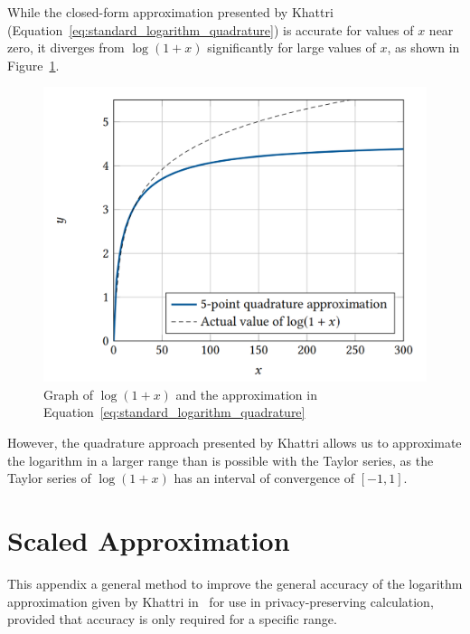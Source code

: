While the closed-form approximation presented by Khattri (Equation~\ref{eq:standard_logarithm_quadrature}) is accurate for values of $x$ near zero, it diverges from $\log{\left(1+x\right)}$ significantly for large values of $x$, as shown in Figure~\ref{fig:standard_logarithm_quadrature}.
\begin{figure}[!ht]
	\centering
    \includegraphics[width=12cm]{figures/graph_log_a2.png}
	\caption{Graph of $\log{\left(1+x\right)}$ and the approximation in Equation~\ref{eq:standard_logarithm_quadrature}}
	\label{fig:standard_logarithm_quadrature}
\end{figure}

However, the quadrature approach presented by Khattri allows us to approximate the logarithm in a larger range than is possible with the Taylor series, as the Taylor series of $\log\left(1+x\right)$ has an interval of convergence of $[-1,1]$.

\section{Scaled Approximation}
\label{sec:logarithm_approximation}
This appendix a general method to improve the general accuracy of the logarithm approximation given by Khattri in~\cite{khattri_new_2009} for use in privacy-preserving calculation, provided that accuracy is only required for a specific range.

